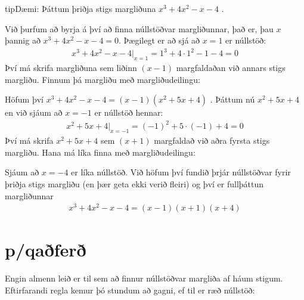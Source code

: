 \documentclass[a4paper,10pt,icelandic]{sphinxmanual}
\begin{document}
\begin{sphinxadmonition}{tip}{Dæmi:}
Þáttum þriðja stigs margliðuna \(x^3+4x^2-x-4\) .

Við þurfum að byrja á því að finna núllstöðvar margliðunnar, það er, þau \(x\) þannig að \(x^3+4x^2-x-4=0\).
Þægilegt er að sjá að \(x=1\) er núllstöð:
\begin{equation*}
\begin{split}x^3+4x^2-x-4 |_{x=1} = 1^3+4\cdot 1^2 -1-4 = 0\end{split}
\end{equation*}
Því má skrifa margliðuna sem liðinn \((x-1)\) margfaldaðan við annars stigs margliðu.
Finnum þá margliðu með margliðudeilingu:

\begin{figure}[H]
\centering

\noindent{}
\end{figure}

Höfum því \(x^3+4x^2-x-4 = (x-1)(x^2+5x+4)\) .
Þáttum nú \(x^2+5x+4\) en við sjáum að \(x=-1\) er núllstöð hennar:
\begin{equation*}
\begin{split}x^2+5x+4|_{x=-1} = (-1)^2+5\cdot(-1)+4 =0\end{split}
\end{equation*}
Því má skrifa \(x^2+5x+4\) sem \((x+1)\) margfaldað við aðra fyrsta stigs margliðu.
Hana má líka finna með margliðudeilingu:

\begin{figure}[H]
\centering

\noindent{}
\end{figure}

Sjáum að \(x=-4\) er líka núllstöð.
Við höfum því fundið þrjár núllstöðvar fyrir þriðja stigs margliðu (en þær geta ekki verið fleiri) og því er fullþáttun margliðunnar
\begin{equation*}
\begin{split}x^3+4x^2-x-4 = (x-1)(x+1)(x+4)\end{split}
\end{equation*}\end{sphinxadmonition}


\section{p/q\sphinxhyphen{}aðferð}
\label{\detokenize{Kafli06:p-q-afer}}
Engin almenn leið er til sem að finnur núllstöðvar margliða af háum stigum. Eftirfarandi regla kemur þó stundum að gagni, ef til er ræð núllstöð:
\end{document}
